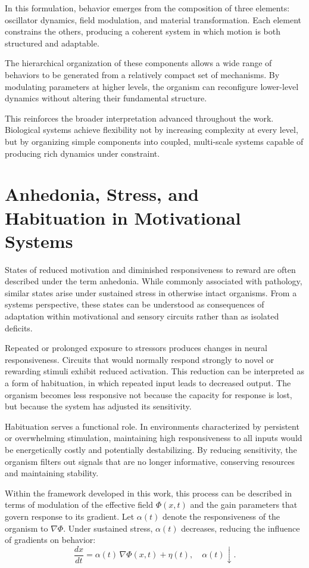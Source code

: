 \documentclass[11pt,oneside]{book}
\begin{document}
In this formulation, behavior emerges from the composition of three elements: oscillator dynamics, field modulation, and material transformation. Each element constrains the others, producing a coherent system in which motion is both structured and adaptable.

The hierarchical organization of these components allows a wide range of behaviors to be generated from a relatively compact set of mechanisms. By modulating parameters at higher levels, the organism can reconfigure lower-level dynamics without altering their fundamental structure.

This reinforces the broader interpretation advanced throughout the work. Biological systems achieve flexibility not by increasing complexity at every level, but by organizing simple components into coupled, multi-scale systems capable of producing rich dynamics under constraint.

\section{Anhedonia, Stress, and Habituation in Motivational Systems}

States of reduced motivation and diminished responsiveness to reward are often described under the term anhedonia. While commonly associated with pathology, similar states arise under sustained stress in otherwise intact organisms. From a systems perspective, these states can be understood as consequences of adaptation within motivational and sensory circuits rather than as isolated deficits.

Repeated or prolonged exposure to stressors produces changes in neural responsiveness. Circuits that would normally respond strongly to novel or rewarding stimuli exhibit reduced activation. This reduction can be interpreted as a form of habituation, in which repeated input leads to decreased output. The organism becomes less responsive not because the capacity for response is lost, but because the system has adjusted its sensitivity.

Habituation serves a functional role. In environments characterized by persistent or overwhelming stimulation, maintaining high responsiveness to all inputs would be energetically costly and potentially destabilizing. By reducing sensitivity, the organism filters out signals that are no longer informative, conserving resources and maintaining stability.

Within the framework developed in this work, this process can be described in terms of modulation of the effective field $\Phi(x,t)$ and the gain parameters that govern response to its gradient. Let $\alpha(t)$ denote the responsiveness of the organism to $\nabla \Phi$. Under sustained stress, $\alpha(t)$ decreases, reducing the influence of gradients on behavior:
\[
\frac{dx}{dt} = \alpha(t)\,\nabla \Phi(x,t) + \eta(t), \quad \alpha(t) \downarrow.
\]
\end{document}

